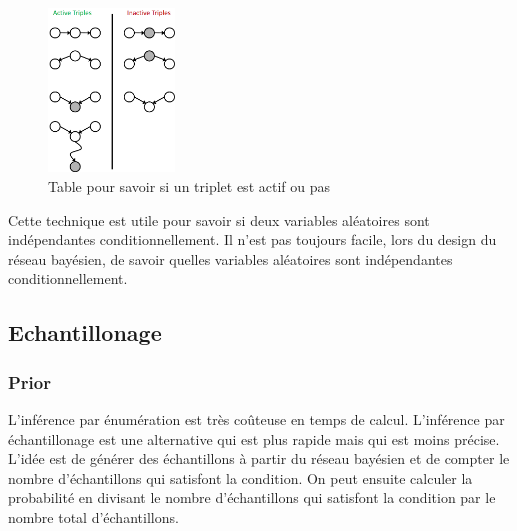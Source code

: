 \begin{figure}[H]
    \begin{center}
        \includegraphics[width=0.3\textwidth]{pictures/triplet.png}
    \end{center}
    \caption{Table pour savoir si un triplet est actif ou pas}\label{fig:triplet}
\end{figure}

\begin{remark}\leavevmode
    Cette technique est utile pour savoir si deux variables aléatoires sont indépendantes conditionnellement. 
    Il n'est pas toujours facile, lors du design du réseau bayésien, de savoir quelles variables aléatoires sont indépendantes conditionnellement.
\end{remark}


\subsection{Echantillonage} %
\label{sub:echantillonage}

\subsubsection{Prior} %
\label{sec:prior}

\begin{remark}\leavevmode
    L'inférence par énumération est très coûteuse en temps de calcul.
    L'inférence par échantillonage est une alternative qui est plus rapide mais qui est moins précise.
    L'idée est de générer des échantillons à partir du réseau bayésien et de compter le nombre d'échantillons qui satisfont la condition.
    On peut ensuite calculer la probabilité en divisant le nombre d'échantillons qui satisfont la condition par le nombre total d'échantillons. 
\end{remark}

